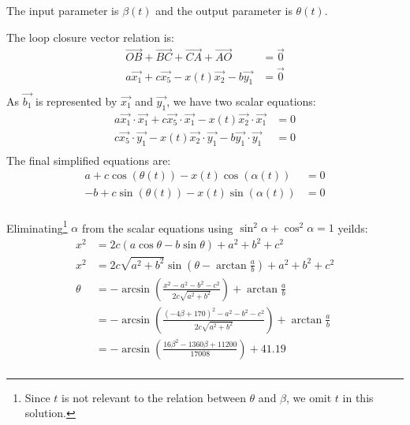 \documentclass{mechexpans}
\def\K{-4}
\def\B{170}
\begin{document}
\begin{solution}
  The input parameter is $\beta(t)$ and the output parameter is $\theta(t)$.
\end{solution}

\begin{solution}
  The loop closure vector relation is:
  \begin{align*}
    \overrightarrow{OB} + \overrightarrow{BC} + \overrightarrow{CA} + \overrightarrow{AO} &= \vec{0} \\
    a\vec{x_1}+c\vec{x_5}-x(t)\vec{x_2}-b\vec{y_1} &= \vec{0} \\
  \end{align*}
  As $\vec{b_1}$ is represented by $\vec{x_1}$ and $\vec{y_1}$, we have two scalar equations:
  \begin{align*}
    a\vec{x_1} \cdot \vec{x_1} + c \vec{x_5} \cdot \vec{x_1} - x(t) \vec{x_2} \cdot \vec{x_1} &= 0 \\
    c\vec{x_5} \cdot \vec{y_1} - x(t)\vec{x_2} \cdot \vec{y_1} -b\vec{y_1}\cdot\vec{y_1} &= 0\\
  \end{align*}
  The final simplified equations are:
  \begin{align*}
    a+c\cos\left(\theta(t)\right) - x(t)\cos\left(\alpha(t)\right) &= 0 \\
    -b+c\sin\left(\theta(t)\right) - x(t)\sin\left(\alpha(t)\right) &= 0 \\
  \end{align*}
\end{solution}

\def\a{\pgfmathprintnumber{\pgfplotstableregressiona}}
\def\b{\pgfmathprintnumber{\pgfplotstableregressionb}}
\def\TheFormula{\theta = -\arcsin\left(\frac{ x^2-a^2-b^2-c^2 }{2c\sqrt{a^2+b^2}} \right) + \arctan\frac{a}{b}}

\begin{solution}
  Eliminating\footnote{Since $t$ is not relevant to the relation between $\theta$ and $\beta$, we omit $t$ in this solution.}
$\alpha$ from the scalar equations using $\sin^2\alpha + \cos^2\alpha = 1$ yeilds:
  \begin{align*}
    x^2 &= 2c(a\cos\theta - b\sin\theta) + a^2 + b^2 + c^2 \\
    x^2 &= 2c\sqrt{a^2+b^2} \sin\left(\theta - \arctan\frac{a}{b}\right)+ a^2 + b^2 + c^2 \\
    \theta &= -\arcsin\left(\frac{ x^2-a^2-b^2-c^2 }{2c\sqrt{a^2+b^2}} \right) + \arctan\frac{a}{b} \\
           &= -\arcsin\left(\frac{ (\K \beta + \B)^2-a^2-b^2-c^2 }{2c\sqrt{a^2+b^2}} \right) + \arctan\frac{a}{b} \\
           &= - \arcsin(\frac{ 16\beta^2-1360\beta+11200 }{17008}) + 41.19 \\
  \end{align*}
\end{solution}
\end{document}
